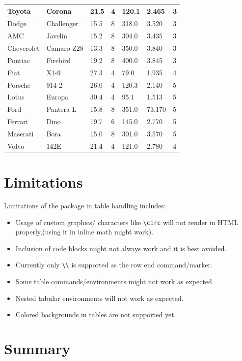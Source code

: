 \begin{longtable}{|p{2cm}|p{2.5cm}|p{1cm}|p{2cm}|p{2cm}|p{2cm}|p{1cm}|}
Toyota &Corona      & 21.5  & 4 &120.1 &2.465   & 3\\ \hline
Dodge &Challenger   & 15.5  & 8 &318.0 &3.520   & 3\\ \hline
AMC &Javelin        & 15.2  & 8 &304.0 &3.435   & 3\\ \hline
Cheverolet &Camaro Z28 & 13.3 & 8& 350.0 &3.840   & 3\\ \hline
Pontiac &Firebird   & 19.2  & 8 &400.0 &3.845   & 3\\ \hline
Fiat &X1-9          & 27.3  & 4 & 79.0 &1.935   & 4\\ \hline
Porsche& 914-2      & 26.0  & 4 &120.3 &2.140   & 5\\ \hline
Lotus& Europa       & 30.4  & 4 & 95.1 &1.513   & 5\\ \hline
Ford &Pantera L     & 15.8  & 8 &351.0 &73.170   & 5\\ \hline
Ferrari &Dino       & 19.7  & 6 &145.0 &2.770   & 5\\ \hline
Maserati& Bora      & 15.0  & 8 &301.0 &3.570   & 5\\ \hline
Volvo &142E         & 21.4  & 4 &121.0 &2.780   & 4\\ 
\hline
\end{longtable}

\section{Limitations}

Limitations of the  package in table handling includes:
\begin{itemize}
\item Usage of custom graphics/ characters like \verb|\circ| will not render in HTML properly,(using it in inline math might work).
\item Inclusion of code blocks might not always work and it is best avoided.
\item Currently only \verb|\\| is supported as the row end command/marker.
\item Some table commands/environments might not work as expected.
\item Nested tabular environments will not work as expected.
\item Colored backgrounds in tables are not supported yet.
\end{itemize}



\section{Summary}

